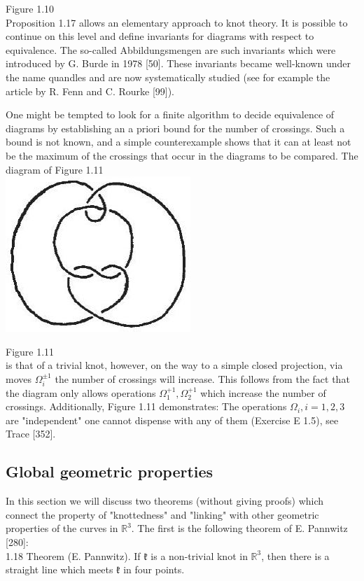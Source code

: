 \documentclass[10pt, letterpaper]{article}
\begin{document}
Figure 1.10\\[0pt]
Proposition 1.17 allows an elementary approach to knot theory. It is possible to continue on this level and define invariants for diagrams with respect to equivalence. The so-called Abbildungsmengen are such invariants which were introduced by G. Burde in 1978 [50]. These invariants became well-known under the name quandles and are now systematically studied (see for example the article by R. Fenn and C. Rourke [99]).

One might be tempted to look for a finite algorithm to decide equivalence of diagrams by establishing an a priori bound for the number of crossings. Such a bound is not known, and a simple counterexample shows that it can at least not be the maximum of the crossings that occur in the diagrams to be compared. The diagram of Figure 1.11\\
\includegraphics[scale=0.2, center]{2025_05_21_9c06be8de7a55410f8c1g-026}

Figure 1.11\\
is that of a trivial knot, however, on the way to a simple closed projection, via moves $\Omega_{i}^{ \pm 1}$ the number of crossings will increase. This follows from the fact that the diagram only allows operations $\Omega_{1}^{+1}, \Omega_{2}^{+1}$ which increase the number of crossings. Additionally, Figure 1.11 demonstrates: The operations $\Omega_{i}, i=1,2,3$ are "independent" one cannot dispense with any of them (Exercise E 1.5), see Trace [352].

\subsection{Global geometric properties}

In this section we will discuss two theorems (without giving proofs) which connect the property of "knottedness" and "linking" with other geometric properties of the curves in $\mathbb{R}^{3}$. The first is the following theorem of E. Pannwitz [280]:\\
1.18 Theorem (E. Pannwitz). If $\mathfrak{k}$ is a non-trivial knot in $\mathbb{R}^{3}$, then there is a straight line which meets $\mathfrak{k}$ in four points.
\end{document}
